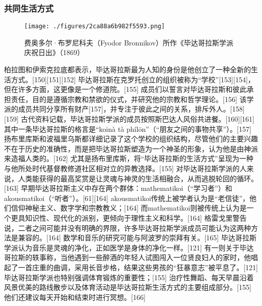 \subsubsection{共同生活方式}
\begin{figure}[ht]
\centering
\texttt{[image: ./figures/2ca88a6b982f5593.png]}
\caption{费奥多尔·布罗尼科夫（Fyodor Bronnikov）所作《毕达哥拉斯学派庆祝日出》（1869）} \label{fig_Pythag_9}
\end{figure}
柏拉图和伊索克拉底都表示，毕达哥拉斯最为人知的身份是他创立了一种全新的生活方式。[150][151][152] 毕达哥拉斯在克罗托创立的组织被称为“学校”[153][154]，但在许多方面，这更像是一个修道院。[155] 成员们以誓言对毕达哥拉斯和彼此承担责任，目的是遵循宗教和禁欲的仪式，并研究他的宗教和哲学理论。[156] 该学派的成员共同分享所有财产[157]，并专注于彼此之间的关系，排斥外人。[158][159] 古代资料记载，毕达哥拉斯学派的成员按照斯巴达人风俗共进餐。[160][161] 其中一条毕达哥拉斯的格言是“koinà tà phílōn”（“朋友之间的事物共享”）。[157] 扬布里库斯和波福里乌斯都详细记录了这个学校的组织结构，尽管他们的主要兴趣不在于历史的准确性，而是把毕达哥拉斯塑造为一个神圣的形象，认为他是由神派来造福人类的。[162] 尤其是扬布里库斯，将“毕达哥拉斯的生活方式”呈现为一种与他所处时代基督教修道社区相对立的异教选择。[155] 对毕达哥拉斯学派的人来说，人类能获得的最高奖赏是让灵魂与神灵的生活相融合，从而逃脱轮回的循环。[163] 早期毕达哥拉斯主义中存在两个群体：mathematikoi（“学习者”）和akousmatikoi（“听者”）。[61][164] akousmatikoi传统上被学者认为是“老信徒”，他们信仰神秘主义、数字学和宗教教义；[164] 而mathematikoi则被传统上认为是一个更具知识性、现代化的派别，更倾向于理性主义和科学。[164] 格雷戈里警告说，二者之间可能并没有明确的界限，许多毕达哥拉斯学派成员可能认为这两种方法是兼容的。[164] 数学和音乐的研究可能与阿波罗的崇拜有关。[165] 毕达哥拉斯学派认为音乐是灵魂的净化，正如医学是身体的净化一样。[121] 有一则关于毕达哥拉斯的轶事称，当他遇到一些醉酒的年轻人试图闯入一位贤良妇人的家时，他唱起了一首庄重的曲调，采用长音步格，结果这些男孩的“狂暴意志”被平息了。[121] 毕达哥拉斯学派也特别强调体育锻炼的重要性；[155] 治疗性舞蹈、每天早晨沿着风景优美的路线散步以及体育活动是毕达哥拉斯生活方式的主要组成部分。[155] 他们还建议每天开始和结束时进行冥想。[166]
